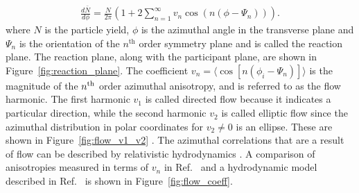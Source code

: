 \begin{align}
\frac{d\bar{N}}{d\phi} = \frac{N}{2\pi} \left( 1 + 2 \sum_{n=1}^{\infty} v_{n} \cos(n(\phi-\Psi_n)) \right).
\end{align}
where  $N$ is the particle yield, $\phi$ is the azimuthal angle in the transverse plane and $\Psi_n$ is the orientation of the $n^{\mathrm{th}}$ order symmetry plane and is called the reaction plane.
The reaction plane, along with the participant plane, are shown in Figure~\ref{fig:reaction_plane}.
The coefficient $v_n = \langle \cos[n(\phi_i - \Psi_n)] \rangle$ is the magnitude of the $n^{\rm{th}}$ order azimuthal anisotropy, and is referred to as the flow harmonic.
The first harmonic $v_1$ is called directed flow because it indicates a particular direction, while the second harmonic $v_2$ is called elliptic flow since the azimuthal distribution in polar coordinates for $v_2 \neq 0$ is an ellipse.
These are shown in Figure~\ref{fig:flow_v1_v2} \cite{Voloshin:2008dg}.
The azimuthal correlations that are a result of flow can be described by relativistic hydrodynamics \cite{Teaney:2001av, HIRANO2006299}.
A comparison of anisotropies measured in terms of $v_n$ in Ref.~\cite{ALICE:2011ab} and a hydrodynamic model described in Ref.~\cite{Niemi:2015qia} is shown in Figure~\ref{fig:flow_coeff}.


